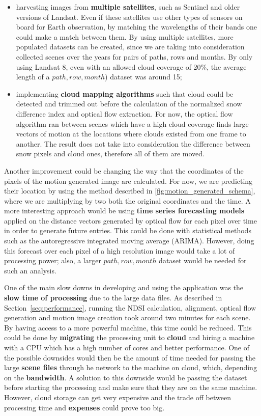 \documentclass[12pt, a4paper]{report}
\begin{document}
	\begin{itemize}
		\item harvesting images from \textbf{multiple satellites}, such as Sentinel and older versions of Landsat. Even if these satellites use other types of sensors on board for Earth observation, by matching the wavelengths of their bands one could make a match between them. By using multiple satellites, more populated datasets can be created, since we are taking into consideration collected scenes over the years for pairs of paths, rows and months. By only using Landsat 8, even with an allowed cloud coverage of 20\%, the average length of a \(path, row, month\)) dataset was around 15;
		\item implementing \textbf{cloud mapping algorithms} such that cloud could be detected and trimmed out before the calculation of the normalized snow difference index and optical flow extraction. For now, the optical flow algorithm ran between scenes which have a high cloud coverage finds large vectors of motion at the locations where clouds existed from one frame to another. The result does not take into consideration the difference between snow pixels and cloud ones, therefore all of them are moved. 
	\end{itemize}

	\par Another improvement could be changing the way that the coordinates of the pixels of the motion generated image are calculated. For now, we are predicting their location by using the method described in \ref{fig:motion_generated_schema}, where we are multiplying by two both the original coordinates and the time. A more interesting approach would be using \textbf{time series forecasting models} applied on the distance vectors generated by optical flow for each pixel over time in order to generate future entries. This could be done with statistical methods such as the autoregressive integrated moving average (ARIMA). However, doing this forecast over each pixel of a high resolution image would take a lot of processing power; also, a larger \(path, row, month\) dataset would be needed for such an analysis.
	
	\par One of the main slow downs in developing and using the application was the \textbf{slow time of processing} due to the large data files. As described in Section~\ref{seq:performance}, running the NDSI calculation, alignment, optical flow generation and motion image creation took around two minutes for each scene. By having access to a more powerful machine, this time could be reduced. This could be done by \textbf{migrating} the processing unit to \textbf{cloud} and hiring a machine with a CPU which has a high number of cores and better performance. One of the possible downsides would then be the amount of time needed for passing the large \textbf{scene files} through he network to the machine on cloud, which, depending on the \textbf{bandwidth}. A solution to this downside would be passing the dataset before starting the processing and make sure that they are on the same machine. However, cloud storage can get very expensive and the trade off between processing time and \textbf{expenses} could prove too big.
	
\end{document}

